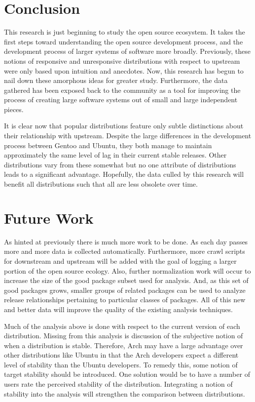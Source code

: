 \documentclass[letterpaper,10pt]{article}
\begin{document}
\section{Conclusion}
This research is just beginning to study the open source ecosystem.  It takes the first steps toward understanding the open source development process, and the development process of larger systems of software more broadly.  Previously, these notions of responsive and unresponsive distributions with respect to upstream were only based upon intuition and anecdotes.  Now, this research has begun to nail down these amorphous ideas for greater study.  Furthermore, the data gathered has been exposed back to the community as a tool for improving the process of creating large software systems out of small and large independent pieces.

It is clear now that popular distributions feature only subtle distinctions about their relationship with upstream.  Despite the large differences in the development process between Gentoo and Ubuntu, they both manage to maintain approximately the same level of lag in their current stable releases.  Other distributions vary from these somewhat but no one attribute of distributions leads to a significant advantage.  Hopefully, the data culled by this research will benefit all distributions such that all are less obsolete over time.
\section{Future Work}
As hinted at previously there is much more work to be done.  As each day passes more and more data is collected automatically.  Furthermore, more crawl scripts for downstream and upstream will be added with the goal of logging a larger portion of the open source ecology.  Also, further normalization work will occur to increase the size of the good package subset used for analysis.  And, as this set of good packages grows, smaller groups of related packages can be used to analyze release relationships pertaining to particular classes of packages.  All of this new and better data will improve the quality of the existing analysis techniques.

Much of the analysis above is done with respect to the current version of each distribution.  Missing from this analysis is discussion of the subjective notion of when a distribution is stable.  Therefore, Arch may have a large advantage over other distributions like Ubuntu in that the Arch developers expect a different level of stability than the Ubuntu developers.  To remedy this, some notion of target stability should be introduced.  One solution would be to have a number of users rate the perceived stability of the distribution.  Integrating a notion of stability into the analysis will strengthen the comparison between distributions.
\end{document}

